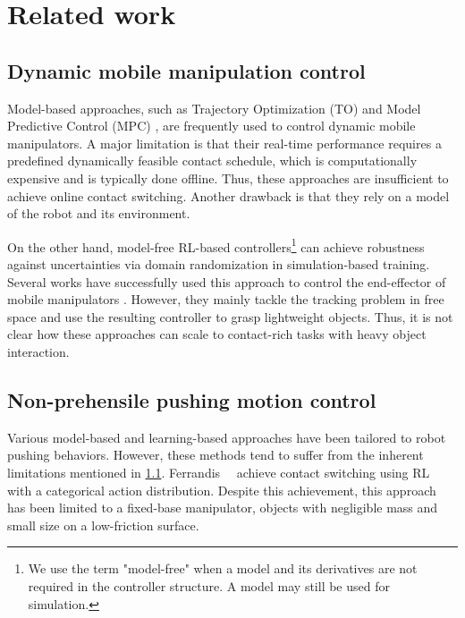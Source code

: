 \section{Related work}
\label{sec:related_work}
%
\subsection{Dynamic mobile manipulation control}
\label{sec:mobile_manipulation}
%
Model-based approaches, such as Trajectory Optimization (TO) \cite{dadiotis2022trajectory, polverini_pushing} and Model Predictive Control (MPC) \cite{sleiman_unified_mpc, minniti_mpc, mayank_articulated, dadiotis_wholebody, pankert_mpc}, are frequently used to control dynamic mobile manipulators. A major limitation is that their real-time performance requires a predefined dynamically feasible contact schedule\cite{sleiman_science_robotics}, which is computationally expensive and is typically done offline. Thus, these approaches are insufficient to achieve online contact switching. Another drawback is that they rely on a model of the robot and its environment.

On the other hand, model-free RL-based controllers\footnote{We use the term "model-free" when a model and its derivatives are not required in the controller structure. A model may still be used for simulation.} can achieve robustness against uncertainties via domain randomization in simulation-based training. Several works have successfully used this approach to control the end-effector of mobile manipulators \cite{fu2023deep, liu2024visual, ha2024umilegs}. However, they mainly tackle the tracking problem in free space and use the resulting controller to grasp lightweight objects. Thus, it is not clear how these approaches can scale to contact-rich tasks with heavy object interaction.
%
\subsection{Non-prehensile pushing motion control}
\label{sec:nonprehensile_manipulation}

Various model-based \cite{hogan_hybrid_mpc, moura_to_planar_manmipulation, inaba_humanoid_pushing, polverini_pushing} and learning-based approaches \cite{ferrandis2023nonprehensile, peng_rl, Lin_vision-proprioception, rizzardo_push_cube} have been tailored to robot pushing behaviors. However, these methods tend to suffer from the inherent limitations mentioned in \cref{sec:mobile_manipulation}. Ferrandis~\etal~\cite{ferrandis2023nonprehensile} achieve contact switching using RL with a categorical action distribution. Despite this achievement, this approach has been limited to a fixed-base manipulator, objects with negligible mass and small size on a low-friction surface.


